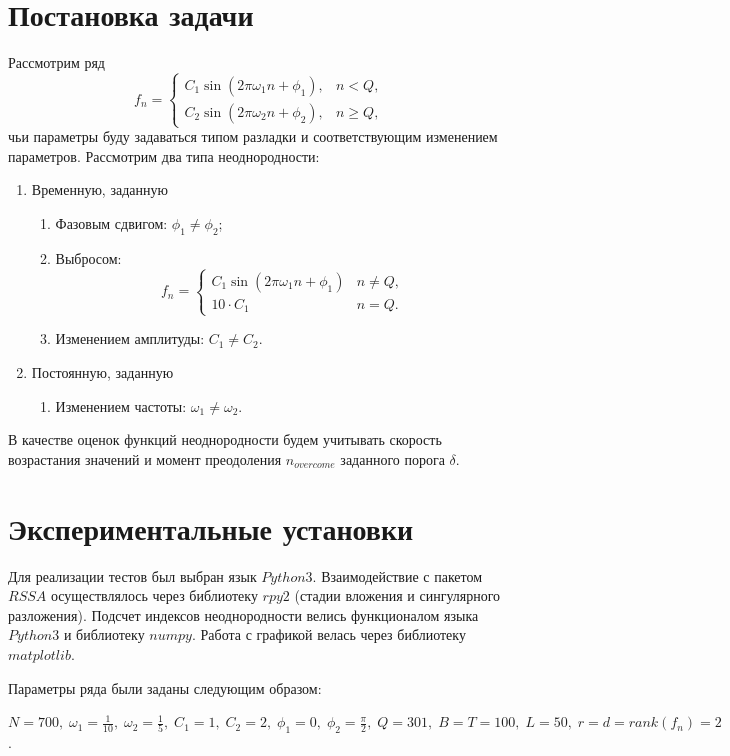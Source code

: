 \documentclass[specialist, substylefile = spbu.rtx,
			   subf, href, 12pt]{disser}
\begin{document}
\section{Постановка задачи}
Рассмотрим ряд $$f_n = 
\begin{cases}
	C_1\sin(2\pi\omega_1n + \phi_1), & n < Q, \\
	C_2\sin(2\pi\omega_2n + \phi_2), & n \geq Q,
\end{cases}$$
чьи параметры буду задаваться типом разладки и соответствующим изменением параметров.
Рассмотрим два типа неоднородности:
\begin{enumerate}
	\item
	Временную, заданную
	\begin{enumerate}
		\item 
		Фазовым сдвигом: $\phi_1 \neq \phi_2$;
		\item 
		Выбросом:
		$$f_n = 
		\begin{cases}
			C_1\sin(2\pi\omega_1n + \phi_1) & n \neq Q, \\
			10\cdot C_1 & n = Q.
		\end{cases}$$
		\item 
		Изменением амплитуды: $C_1 \neq C_2$.
	\end{enumerate}
	
	\item
	Постоянную, заданную
	\begin{enumerate}
		\item 
		Изменением частоты: $\omega_1 \neq \omega_2$.
	\end{enumerate}
	
\end{enumerate}

В качестве оценок функций неоднородности будем учитывать скорость возрастания значений и момент преодоления $n_{overcome}$ заданного порога $\delta$.


\section{Экспериментальные установки}
Для реализации тестов был выбран язык $Python3$. Взаимодействие с пакетом $RSSA$ осуществлялось через библиотеку $rpy2$ (стадии вложения и сингулярного разложения). Подсчет индексов неоднородности велись функционалом языка $Python3$ и библиотеку $numpy$. Работа с графикой велась через библиотеку $matplotlib$. 

Параметры ряда были заданы следующим образом: 

$ N = 700, \;\omega_1 = \frac{1}{10},\; \omega_2 = \frac{1}{5},\; C_1 = 1, \; C_2 = 2,\; \phi_1=0,\; \phi_2=\frac{\pi}{2},\; Q = 301,\; B = T = 100,\; L = 50,\; r=d=rank(f_n)=2$.
\end{document}
